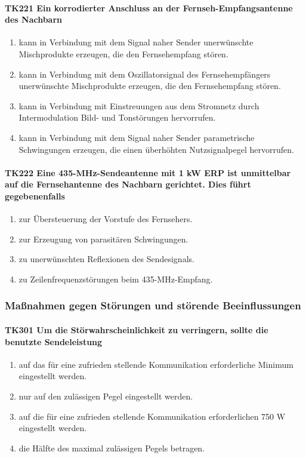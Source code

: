 \documentclass[8pt]{article}
\begin{document}
\paragraph*{TK221 Ein korrodierter Anschluss an der Fernseh-Empfangsantenne des Nachbarn} 
\begin{enumerate}[nolistsep,label=\Alph*]
\item kann in Verbindung mit dem Signal naher Sender unerwünschte Mischprodukte erzeugen, die den Fernsehempfang stören.
\item kann in Verbindung mit dem Oszillatorsignal des Fernsehempfängers unerwünschte Mischprodukte erzeugen, die den Fernsehempfang stören.
\item kann in Verbindung mit Einstreuungen aus dem Stromnetz durch Intermodulation Bild- und Tonstörungen hervorrufen. 
\item kann in Verbindung mit dem Signal naher Sender parametrische Schwingungen erzeugen, die einen überhöhten Nutzsignalpegel hervorrufen.
\end{enumerate}

\paragraph*{TK222 Eine 435-MHz-Sendeantenne mit 1 kW ERP ist unmittelbar auf die Fernsehantenne des Nachbarn gerichtet. Dies führt gegebenenfalls} 
\begin{enumerate}[nolistsep,label=\Alph*]
\item zur Übersteuerung der Vorstufe des Fernsehers.
\item zur Erzeugung von parasitären Schwingungen.
\item zu unerwünschten Reflexionen des Sendesignals.
\item zu Zeilenfrequenzstörungen beim 435-MHz-Empfang.
\end{enumerate}

\pagebreak
\subsubsection{Maßnahmen gegen Störungen und störende Beeinflussungen}
\paragraph*{TK301 Um die Störwahrscheinlichkeit zu verringern, sollte die benutzte Sendeleistung} 
\begin{enumerate}[nolistsep,label=\Alph*]
\item auf das für eine zufrieden stellende Kommunikation erforderliche Minimum eingestellt werden.
\item nur auf den zulässigen Pegel eingestellt werden. 
\item auf die für eine zufrieden stellende Kommunikation erforderlichen 750 W eingestellt werden.
\item die Hälfte des maximal zulässigen Pegels betragen.
\end{enumerate}
\end{document}
